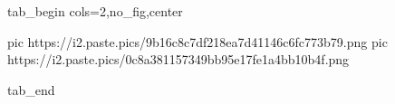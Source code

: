 
 
 
 
 


\ifcmt
  tab_begin cols=2,no_fig,center

     pic https://i2.paste.pics/9b16c8c7df218ea7d41146c6fc773b79.png
		 pic https://i2.paste.pics/0c8a381157349bb95e17fe1a4bb10b4f.png

  tab_end
\fi
